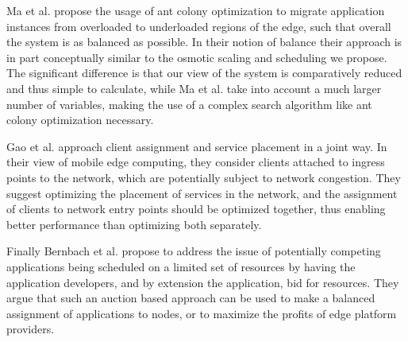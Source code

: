 Ma et al.\cite{maContainerMigrationMechanism2020} propose the usage of ant colony optimization to migrate application instances from overloaded to underloaded regions of the edge, such that overall the system is as balanced as possible.
In their notion of balance their approach is in part conceptually similar to the osmotic scaling and scheduling we propose.
The significant difference is that our view of the system is comparatively reduced and thus simple to calculate, while Ma et al. take into account a much larger number of variables, making the use of a complex search algorithm like ant colony optimization necessary.

Gao et al.\cite{gaoWinningStartingLine2019} approach client assignment and service placement in a joint way.
In their view of mobile edge computing, they consider clients attached to ingress points to the network, which are potentially subject to network congestion.
They suggest optimizing the placement of services in the network, and the assignment of clients to network entry points should be optimized together, thus enabling better performance than optimizing both separately.

Finally Bernbach et al.\cite{beraldiCooperativeLoadBalancing2017} propose to address the issue of potentially competing applications being scheduled on a limited set of resources by having the application developers, and by extension the application, bid for resources.
They argue that such an auction based approach can be used to make a balanced assignment of applications to nodes, or to maximize the profits of edge platform providers.

